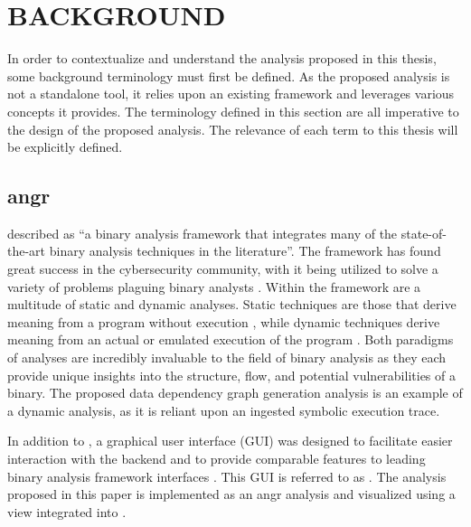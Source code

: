 \chapter{BACKGROUND}
In order to contextualize and understand the analysis proposed in this thesis, some background terminology must first be defined. As the proposed analysis is not a standalone tool, it relies upon an existing framework and leverages various concepts it provides. The terminology defined in this section are all imperative to the design of the proposed analysis. The relevance of each term to this thesis will be explicitly defined. 
\section{angr}
\citet{shoshitaishvili2016sok} described  as “a binary analysis framework that integrates many of the state-of-the-art binary analysis techniques in the literature”. The framework has found great success in the cybersecurity community, with it being utilized to solve a variety of problems plaguing binary analysts \citep{flackgraph, 8077799, stephens2016driller, taylor2016tool, wang2017ramblr, wang2017semdiff}. Within the framework are a multitude of static and dynamic analyses. Static techniques are those that derive meaning from a program without execution  \citep{parvez2016combining, redini2017bootstomp, zheng2016lightweight}, while dynamic techniques derive meaning from an actual or emulated execution of the program \citep{shoshitaishvili2016sok, buhov2016catch, hernandez2017firmusb, honig2017autonomous}. Both paradigms of analyses are incredibly invaluable to the field of binary analysis as they each  provide unique insights into the structure, flow, and potential vulnerabilities of a binary. The proposed data dependency graph generation analysis is an example of a dynamic analysis, as it is reliant upon an ingested symbolic execution trace.

In addition to , a graphical user interface (GUI) was designed to facilitate easier interaction with the backend and to provide comparable features to leading binary analysis framework interfaces \citep{binja, ghidra, ida}. This GUI is referred to as . The analysis proposed in this paper is implemented as an angr analysis and visualized using a view integrated into . 
